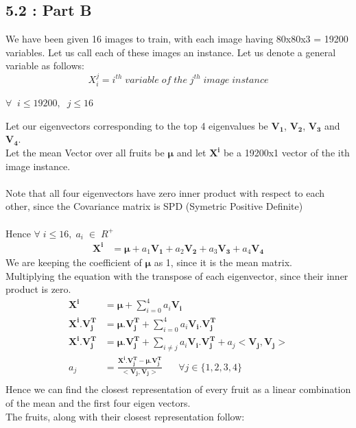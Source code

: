 \documentclass[12pt, a4paper]{article}
\begin{document}
\subsection*{5.2 : Part B}
\hspace{1cm} We have been given 16 images to train, with each image having 80x80x3 = 19200 variables. Let us call each of these images an instance. Let us denote a general variable as follows:
$$X_i^j = i^{th} \; variable \; of \; the \; j^{th} \; image \; instance$$
\vspace{-30pt}
\begin{flushright}
$\forall \;\; i \leq 19200, \; \; j \leq 16$
\end{flushright}
Let our eigenvectors corresponding to the top 4 eigenvalues be $\mathbf{V_1}$, $\mathbf{V_2}$, $\mathbf{V_3}$ and $\mathbf{V_4}$. \\
Let the mean Vector over all fruits be $\boldsymbol{\mu}$ and let $\mathbf{X^i}$ be a 19200x1 vector of the ith image instance.\\ \\
Note that all four eigenvectors have zero inner product with respect to each other, since the Covariance matrix is SPD (Symetric Positive Definite)\\ \\
Hence $\forall \; i \leq 16, \; a_i \; \in \; R^+ $
\begin{align*}
\boldsymbol{X^i} &= \boldsymbol{\mu} + a_1\boldsymbol{V_1} + a_2\boldsymbol{V_2} + a_3\boldsymbol{V_3} + a_4\boldsymbol{V_4}
\end{align*}
We are keeping the coefficient of $\boldsymbol\mu$ as 1, since it is the mean matrix.\\
Multiplying the equation with the transpose of each eigenvector, since their inner product is zero.
\begin{align*}
\boldsymbol{X^i} &= \boldsymbol{\mu} + \sum_{i=0}^4 a_i\boldsymbol{V_i} \\
\boldsymbol{X^i.V_j^T} &= \boldsymbol{\mu.V_j^T} + \sum_{i=0}^4 a_i\boldsymbol{V_i.V_j^T} \\
\boldsymbol{X^i.V_j^T} &= \boldsymbol{\mu.V_j^T} + \sum_{i \neq j} a_i\boldsymbol{V_i.V_j^T} + a_j<\boldsymbol{V_j, V_j}>\\
a_j &= \frac{\boldsymbol{X^i.V_j^T} - \boldsymbol{\mu.V_j^T}}{<\boldsymbol{V_j, V_j}>} \;\;\;\;\;\; \forall j \in \{1,2,3,4\}\\
\end{align*}
Hence we can find the closest representation of every fruit as a linear combination of the mean and the first four eigen vectors.\\
The fruits, along with their closest representation follow:
\end{document}
